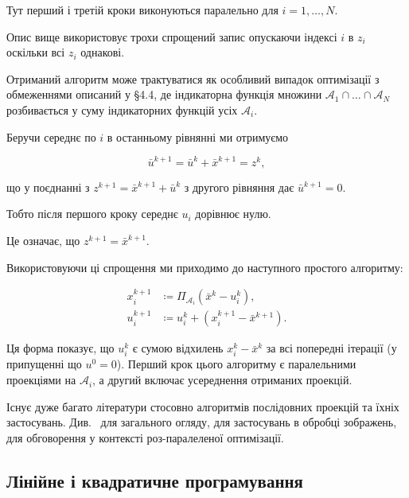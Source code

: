 Тут перший і третій кроки виконуються паралельно для $i = 1, \ldots, N$.

\begin{remark}
	Опис вище використовує трохи спрощений запис опускаючи індексі $i$ в $z_i$ оскільки всі $z_i$ однакові.
\end{remark}

Отриманий алгоритм може трактуватися як особливий випадок оптимізації з обмеженнями описаний у \S4.4, де індикаторна функція множини $\mathcal{A}_1 \cap \ldots \cap \mathcal{A}_N$ розбивається у суму індикаторних функцій усіх $\mathcal{A}_i$. 

\begin{remark}
	Беручи середнє по $i$ в останньому рівнянні ми отримуємо
	
	\begin{equation}
		\bar u^{k + 1} = \bar u^k + \bar x^{k + 1} = z^k,
	\end{equation}
	
	що у поєднанні з $z^{k + 1} = \bar x^{k + 1} + \bar u^k$ з другого рівняння дає $\bar u^{k + 1} = 0$. \medskip
	
	Тобто після першого кроку середнє $u_i$ дорівнює нулю. \medskip
	
	Це означає, що $z^{k + 1} = \bar x^{k + 1}$.
\end{remark}

Використовуючи ці спрощення ми приходимо до наступного простого алгоритму:

\begin{align}
	x_i^{k + 1} &\coloneqq \Pi_{\mathcal{A}_i}
	\left( \bar x^k - u_i^k \right), \\
	u_i^{k + 1} &\coloneqq u_i^k + 
	\left( x_i^{k + 1} - \bar x^{k + 1} \right).
\end{align}

Ця форма показує, що $u_i^k$ є сумою відхилень $x_i^k - \bar x^k$ за всі попередні ітерації (у припущенні що $u^0 = 0$). Перший крок цього алгоритму є паралельними проекціями на $\mathcal{A}_i$, а другий включає усереднення отриманих проекцій. \medskip

Існує дуже багато літератури стосовно алгоритмів послідовних проекцій та їхніх застосувань. Див.~\cite{10} для загального огляду, \cite{39} для застосувань в обробці зображень, \cite[\S5]{31} для обговорення у контексті роз-паралеленої оптимізації.

\subsection{Лінійне і квадратичне програмування}

